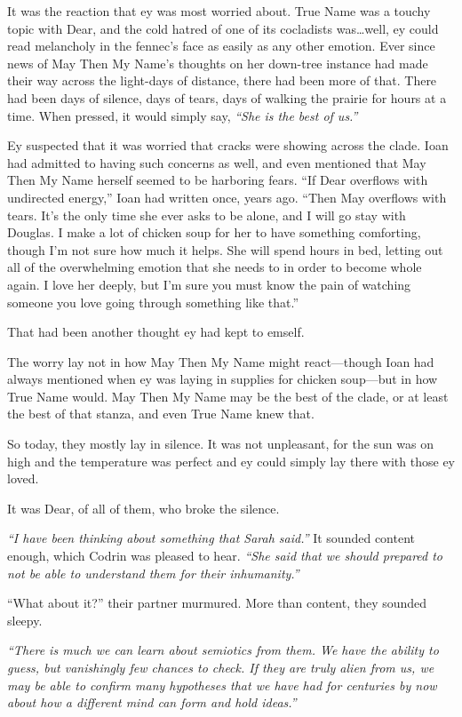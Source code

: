 It was the reaction that ey was most worried about. True Name was a touchy topic with Dear, and the cold hatred of one of its cocladists was\ldots well, ey could read melancholy in the fennec's face as easily as any other emotion. Ever since news of May Then My Name's thoughts on her down-tree instance had made their way across the light-days of distance, there had been more of that. There had been days of silence, days of tears, days of walking the prairie for hours at a time. When pressed, it would simply say, \emph{``She is the best of us.''}

Ey suspected that it was worried that cracks were showing across the clade. Ioan had admitted to having such concerns as well, and even mentioned that May Then My Name herself seemed to be harboring fears. ``If Dear overflows with undirected energy,'' Ioan had written once, years ago. ``Then May overflows with tears. It's the only time she ever asks to be alone, and I will go stay with Douglas. I make a lot of chicken soup for her to have something comforting, though I'm not sure how much it helps. She will spend hours in bed, letting out all of the overwhelming emotion that she needs to in order to become whole again. I love her deeply, but I'm sure you must know the pain of watching someone you love going through something like that.''

That had been another thought ey had kept to emself.

The worry lay not in how May Then My Name might react—though Ioan had always mentioned when ey was laying in supplies for chicken soup—but in how True Name would. May Then My Name may be the best of the clade, or at least the best of that stanza, and even True Name knew that.

So today, they mostly lay in silence. It was not unpleasant, for the sun was on high and the temperature was perfect and ey could simply lay there with those ey loved.

It was Dear, of all of them, who broke the silence.

\emph{``I have been thinking about something that Sarah said.''} It sounded content enough, which Codrin was pleased to hear. \emph{``She said that we should prepared to not be able to understand them for their inhumanity.''}

``What about it?'' their partner murmured. More than content, they sounded sleepy.

\emph{``There is much we can learn about semiotics from them. We have the ability to guess, but vanishingly few chances to check. If they are truly alien from us, we may be able to confirm many hypotheses that we have had for centuries by now about how a different mind can form and hold ideas.''}

